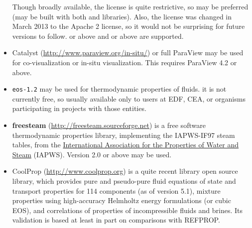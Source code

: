 \documentclass[a4paper,10pt,twoside]{csshortdoc}
\begin{document}
\begin{itemize}
      Though broadly available, the \parmetis license is quite restrictive,
      so \ptscotch may be preferred (\CS may be built with both
      \metis and \scotch libraries). Also, the \metis license was changed
      in March 2013 to the Apache 2 license, so it would not be surprising
      for future \parmetis versions to follow.  or above and
       or above are supported.

\item Catalyst (\url{http://www.paraview.org/in-situ/}) or full ParaView
      may be used for co-visualization or in-situ visualization.
      This requires ParaView 4.2 or above.

\item \texttt{eos-1.2} may be used for thermodynamic properties of fluids.
      it is not currently free, so usually available only to users at EDF,
      CEA, or organisms participating in projects with those entities.

\item \textbf{freesteam} (\url{http://freesteam.sourceforge.net}) is a
      free software thermodynamic properties library, implementing the
      IAPWS-IF97 steam tables, from the \href{http://www.iapws.org}{International
      Association for the Properties of Water and Steam} (IAPWS).
      Version 2.0 or above may be used.

\item CoolProp (\url{http://www.coolprop.org}) is a quite recent library
      open source library, which provides pure and pseudo-pure fluid
      equations of state and transport properties for 114 components
      (as of version 5.1), mixture properties using high-accuracy Helmholtz
      energy formulations (or cubic EOS), and correlations of properties
      of incompressible fluids and brines. Its validation is based at least
      in part on comparisons with REFPROP.


\end{itemize}
\end{document}
